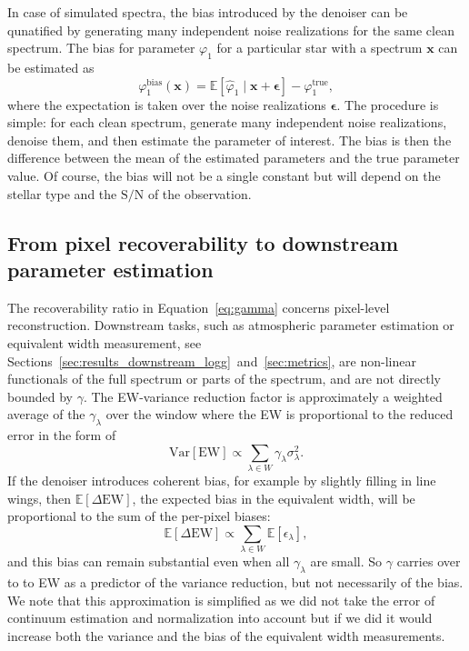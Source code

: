 \documentclass[twocolumn]{aastex7}
\newcommand{\m}[1]{\boldsymbol{#1}}
\newcommand{\SNR}{\mathrm{S}/\mathrm{N}}
\begin{document}
In case of simulated spectra, the bias introduced by the denoiser can be qunatified by generating many independent noise realizations for the same clean spectrum. The bias for parameter $\varphi_1$ for a particular star with a spectrum $\m{x}$ can be estimated as
\begin{equation}
    \varphi_1^\mathrm{bias}(\m{x}) = \mathbb{E}\!\left[\hat{\varphi}_1 \mid \m{x} + \m{\epsilon} \right] - \varphi_1^\mathrm{true},
\end{equation}
where the expectation is taken over the noise realizations $\m{\epsilon}$. The procedure is simple: for each clean spectrum, generate many independent noise realizations, denoise them, and then estimate the parameter of interest. The bias is then the difference between the mean of the estimated parameters and the true parameter value. Of course, the bias will not be a single constant but will depend on the stellar type and the $\SNR$ of the observation.

\subsection{From pixel recoverability to downstream parameter estimation}

The recoverability ratio in Equation~\ref{eq:gamma} concerns pixel-level reconstruction. Downstream tasks, such as atmospheric parameter estimation or equivalent width measurement, see Sections~\ref{sec:results_downstream_logg}~and~\ref{sec:metrics}, are non-linear functionals of the full spectrum or parts of the spectrum, and are not directly bounded by $\gamma$. The EW-variance reduction factor is approximately a weighted average of the $\gamma_\lambda$ over the window where the EW is proportional to the reduced error in the form of
\begin{equation}
    \mathrm{Var}[\mathrm{EW}] \propto \sum_{\lambda\in W} \gamma_\lambda \sigma_\lambda^2.
\end{equation}
If the denoiser introduces coherent bias, for example by slightly filling in line wings, then $\mathbb{E}[\Delta \mathrm{EW}]$, the expected bias in the equivalent width, will be proportional to the sum of the per-pixel biases:
\begin{equation}
    \mathbb{E}[\Delta \mathrm{EW}] \propto
    \sum_{\lambda\in W}\mathbb{E}[\epsilon_{\lambda}],
\end{equation}
and this bias can remain substantial even when all $\gamma_\lambda$ are small. So $\gamma$ carries over to to EW as a predictor of the variance reduction, but not necessarily of the bias. We note that this approximation is simplified as we did not take the error of continuum estimation and normalization into account but if we did it would increase both the variance and the bias of the equivalent width measurements.
\end{document}
